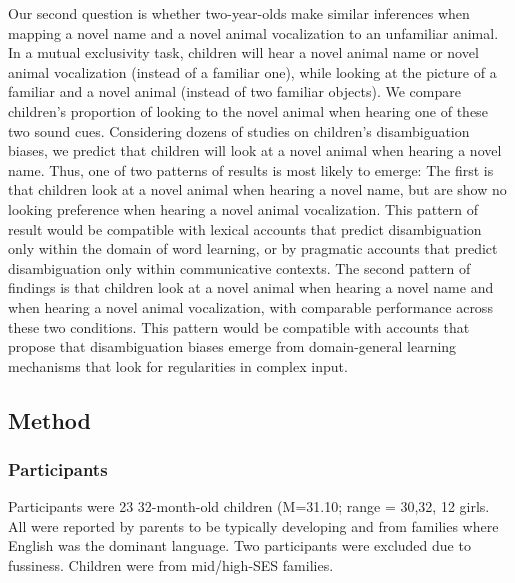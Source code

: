 \documentclass[english,floatsintext,man]{apa6}
\theoremstyle{definition}
\theoremstyle{definition}
\theoremstyle{definition}
\theoremstyle{remark}
\begin{document}
Our second question is whether two-year-olds make similar inferences
when mapping a novel name and a novel animal vocalization to an
unfamiliar animal. In a mutual exclusivity task, children will hear a
novel animal name or novel animal vocalization (instead of a familiar
one), while looking at the picture of a familiar and a novel animal
(instead of two familiar objects). We compare children's proportion of
looking to the novel animal when hearing one of these two sound cues.
Considering dozens of studies on children's disambiguation biases, we
predict that children will look at a novel animal when hearing a novel
name. Thus, one of two patterns of results is most likely to emerge: The
first is that children look at a novel animal when hearing a novel name,
but are show no looking preference when hearing a novel animal
vocalization. This pattern of result would be compatible with lexical
accounts that predict disambiguation only within the domain of word
learning, or by pragmatic accounts that predict disambiguation only
within communicative contexts. The second pattern of findings is that
children look at a novel animal when hearing a novel name and when
hearing a novel animal vocalization, with comparable performance across
these two conditions. This pattern would be compatible with accounts
that propose that disambiguation biases emerge from domain-general
learning mechanisms that look for regularities in complex input.

\hypertarget{method}{%
\subsection{Method}\label{method}}

\hypertarget{participants}{%
\subsubsection{Participants}\label{participants}}

Participants were 23 32-month-old children (M=31.10; range = 30,32, 12
girls. All were reported by parents to be typically developing and from
families where English was the dominant language. Two participants were
excluded due to fussiness. Children were from mid/high-SES families.
\end{document}
